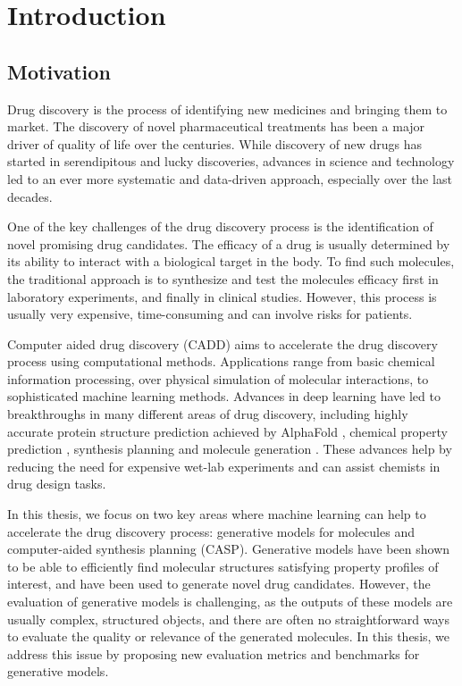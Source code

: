 \chapter{Introduction\label{chap:introduction}}
\section{Motivation}
Drug discovery is the process of identifying new medicines and bringing them to
market. The discovery of novel pharmaceutical treatments has been a major driver
of quality of life over the centuries. While discovery of new drugs has started 
in serendipitous and lucky discoveries, advances in science and technology  
led to an ever more systematic and data-driven approach, especially over the
last decades. 

One of the key challenges of the drug discovery process is the identification
of novel promising drug candidates. The efficacy of a drug is usually determined by its ability
to interact with a biological target in the body. To find such molecules,
the traditional approach is to synthesize and test the molecules efficacy first in laboratory
experiments, and finally in clinical studies. However, this process is usually very expensive, time-consuming
and can involve risks for patients.

Computer aided drug discovery (CADD) aims to accelerate the drug discovery
process using computational methods. Applications range from basic chemical
information processing, over physical simulation of molecular interactions, to
sophisticated machine learning methods. Advances in deep learning
\citep{chenRiseDeepLearning2018} have led to breakthroughs in many different
areas of drug discovery, including highly accurate protein structure prediction 
achieved by AlphaFold \citep{todo}, chemical property prediction
\citep{mayrDeepToxToxicityPrediction2016,todo}, synthesis planning
\citep{seglerNeuralSymbolicMachineLearning2017} and molecule generation
\citep{todo}. These advances help by reducing the need for expensive 
wet-lab experiments and can assist chemists in drug design tasks. 

In this thesis, we focus on two key areas where machine learning can help to
accelerate the drug discovery process: generative models for molecules and
computer-aided synthesis planning (CASP). Generative models have been shown to
be able to efficiently find molecular structures satisfying property profiles of
interest, and have been used to generate novel drug candidates. However, the
evaluation of generative models is challenging, as the outputs of these models
are usually complex, structured objects, and there are often no straightforward
ways to evaluate the quality or relevance of the generated molecules. In this
thesis, we address this issue by proposing new evaluation metrics and benchmarks
for generative models.

